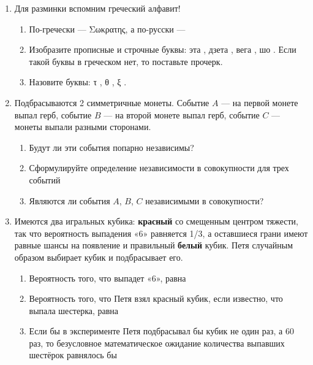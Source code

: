 \documentclass[12pt, a4paper]{article}\usepackage[]{graphicx}\usepackage[]{color}
\begin{document}
\begin{enumerate}
\item Для разминки вспомним греческий алфавит!

\begin{enumerate}
\item По-гречески — Σωκρατης, а по-русски — \underline{\hspace{2cm}}
\item Изобразите прописные и строчные буквы: эта \underline{\hspace{2cm}}, дзета \underline{\hspace{2cm}}, вега \underline{\hspace{2cm}}, шо \underline{\hspace{2cm}}. Если такой буквы в греческом нет, то поставьте прочерк.
\item Назовите буквы: τ \underline{\hspace{2cm}}, θ \underline{\hspace{2cm}}, ξ \underline{\hspace{2cm}}.
\end{enumerate}

\item Подбрасываются 2 симметричные монеты. Событие $A$ — на первой монете выпал герб, событие $B$ — на второй монете выпал герб, событие $C$ — монеты выпали разными сторонами.
\begin{enumerate}
\item Будут ли эти события попарно независимы?
\item Сформулируйте определение независимости в совокупности для трех событий
\item Являются ли события $A$, $B$, $C$ независимыми в совокупности?
\end{enumerate}


\item Имеются два игральных кубика: \textbf{красный} со смещенным центром тяжести, так что вероятность выпадения «6» равняется 1/3, а оставшиеся грани имеют равные шансы на появление и
правильный \textbf{белый} кубик.  Петя случайным образом выбирает кубик и подбрасывает его.
\begin{enumerate}
\item Вероятность того, что выпадет «6», равна \underline{\hspace{2cm}}
\item Вероятность того, что Петя взял красный кубик, если известно, что выпала шестерка, равна \underline{\hspace{2cm}}
\item Если бы в эксперименте Петя подбрасывал  бы кубик не один раз, а 60 раз, то безусловное математическое ожидание количества выпавших шестёрок равнялось бы \underline{\hspace{2cm}}
\end{enumerate}



\end{enumerate}
\end{document}
